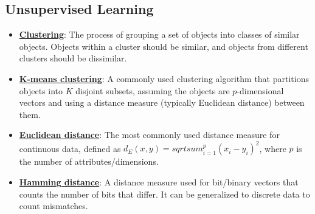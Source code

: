 \documentclass{article}%
\begin{document}
%
\subsection{Unsupervised Learning}%
\label{subsec:UnsupervisedLearning}%
\begin{itemize}[leftmargin=*]%
\item \href{https://purdue.brightspace.com/d2l/common/assets/pdfjs-d2l-dist/1.0.14-legacy/web/viewer.html?file=\%2Fcontent\%2Fenforced\%2F1095467-wl.202510.CS.24300.001\%2F12L2-distance-clusters.pdf\%3Fou\%3D1095467\&lang=en-us\&container=d2l-fileviewer-rendered-pdf\&fullscreen=d2l-fileviewer-rendered-pdf-dialog\&height=667#page=4}{\textbf{Clustering}}: The process of grouping a set of objects into classes of similar objects. Objects within a cluster should be similar, and objects from different clusters should be dissimilar.%
\item \href{https://purdue.brightspace.com/d2l/common/assets/pdfjs-d2l-dist/1.0.14-legacy/web/viewer.html?file=\%2Fcontent\%2Fenforced\%2F1095467-wl.202510.CS.24300.001\%2F12L2-distance-clusters.pdf\%3Fou\%3D1095467\&lang=en-us\&container=d2l-fileviewer-rendered-pdf\&fullscreen=d2l-fileviewer-rendered-pdf-dialog\&height=667#page=21}{\textbf{K-means clustering}}: A commonly used clustering algorithm that partitions objects into $K$ disjoint subsets, assuming the objects are $p$-dimensional vectors and using a distance measure (typically Euclidean distance) between them.%
\item \href{https://purdue.brightspace.com/d2l/common/assets/pdfjs-d2l-dist/1.0.14-legacy/web/viewer.html?file=\%2Fcontent\%2Fenforced\%2F1095467-wl.202510.CS.24300.001\%2F12L2-distance-clusters.pdf\%3Fou\%3D1095467\&lang=en-us\&container=d2l-fileviewer-rendered-pdf\&fullscreen=d2l-fileviewer-rendered-pdf-dialog\&height=667#page=17}{\textbf{Euclidean distance}}: The most commonly used distance measure for continuous data, defined as $d_E(x, y) =  sqrt{ sum_{i=1}^{p} (x_i - y_i)^2}$, where $p$ is the number of attributes/dimensions.%
\item \href{https://purdue.brightspace.com/d2l/common/assets/pdfjs-d2l-dist/1.0.14-legacy/web/viewer.html?file=\%2Fcontent\%2Fenforced\%2F1095467-wl.202510.CS.24300.001\%2F12L2-distance-clusters.pdf\%3Fou\%3D1095467\&lang=en-us\&container=d2l-fileviewer-rendered-pdf\&fullscreen=d2l-fileviewer-rendered-pdf-dialog\&height=667#page=19}{\textbf{Hamming distance}}: A distance measure used for bit/binary vectors that counts the number of bits that differ. It can be generalized to discrete data to count mismatches.%

\end{itemize}
\end{document}
